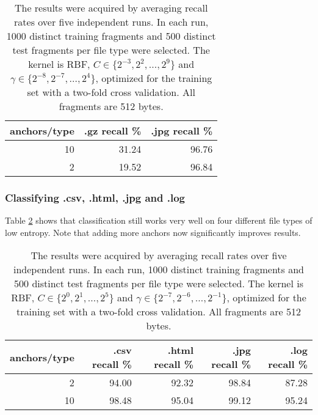 \begin{table}[h]
\begin{tabular}{rrr}
\hline
   anchors/type &   .gz recall \% &   .jpg recall \% \\
\hline
             10 &           31.24 &           96.76 \\
              2 &           19.52 &           96.84 \\
\hline
\end{tabular}
\caption{
The results were acquired by averaging recall rates over five
independent runs. In each run, 1000 distinct training fragments and 500
distinct test fragments per file type were selected. The kernel is RBF, $C
\in \{ 2^{-3}, 2^{2}, \dots, 2^{9} \}$ and $\gamma \in \{2^{-8}, 2^{-7},
\dots, 2^{4} \}$, optimized for the training set with a two-fold cross
validation. All fragments are 512 bytes.} \label{table:gz_jpg_recall}
\end{table}



\subsubsection{Classifying .csv, .html, .jpg and .log}

Table \ref{table:csv_html_jpg_log_recall} shows that classification still
works very well on four different file types of low entropy. Note that
adding more anchors now significantly improves results.


\begin{table}[h]
\begin{tabular}{rrrrr}
\hline
   anchors/type &   .csv recall \% &   .html recall \% &   .jpg recall \% &   .log recall \% \\
\hline
              2 &           94.00    &            92.32 &           98.84 &           87.28 \\
             10 &           98.48 &            95.04 &           99.12 &           95.24 \\
\hline
\end{tabular}
\caption{
The results were acquired by averaging recall rates over five
independent runs. In each run, 1000 distinct training fragments and 500
distinct test fragments per file type were selected. The kernel is RBF, $C
\in \{ 2^{0}, 2^{1}, \dots, 2^{5} \}$ and $\gamma \in \{2^{-7}, 2^{-6},
\dots, 2^{-1} \}$, optimized for the training set with a two-fold cross
validation. All fragments are 512 bytes.}
\label{table:csv_html_jpg_log_recall}
\end{table}



